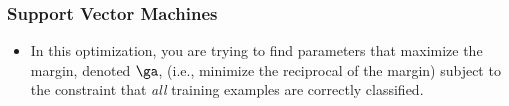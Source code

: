 \documentclass[trans,aspectratio=169]{beamer}
\begin{document}
\begin{frame}
  \frametitle{Support Vector Machines}
\begin{itemize}
\item 
In this optimization, you are trying to find parameters that maximize
the margin, denoted $\ga$, (i.e., minimize the reciprocal of the
margin) subject to the constraint that \emph{all} training examples
are correctly classified.
\end{itemize}
\end{frame}

\end{document}
